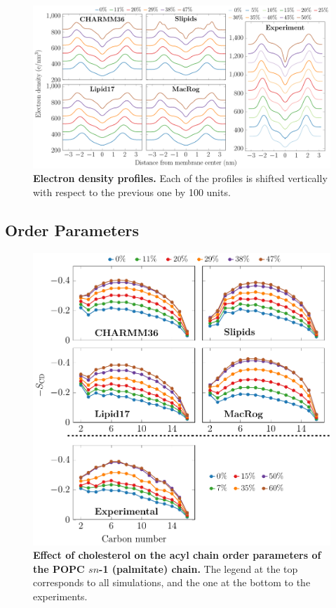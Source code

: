 \documentclass[journal=jpcbfk]{achemso}
\begin{document}
\begin{figure}[htb!]
    \centering
    \includegraphics[width=\linewidth]{../FIGS/densityprofiles.pdf}
    \caption{\label{SIfig:densprofs}%
    \textbf{Electron density profiles.}
    Each of the profiles is shifted vertically with respect to the previous one by 100 units.
    }
\end{figure}

\clearpage
\subsection{Order Parameters}

\begin{figure}[htb!]
    \centering
    \includegraphics[width=0.9\linewidth]{../FIGS/palmitate.pdf}
    \caption{\label{SIfig:palmitate}%
     \textbf{Effect of cholesterol on the acyl chain order parameters of the POPC $sn$-1 (palmitate) chain.}
     The legend at the top corresponds to all simulations, and the one at the bottom to the experiments.
    }
\end{figure}
\end{document}
